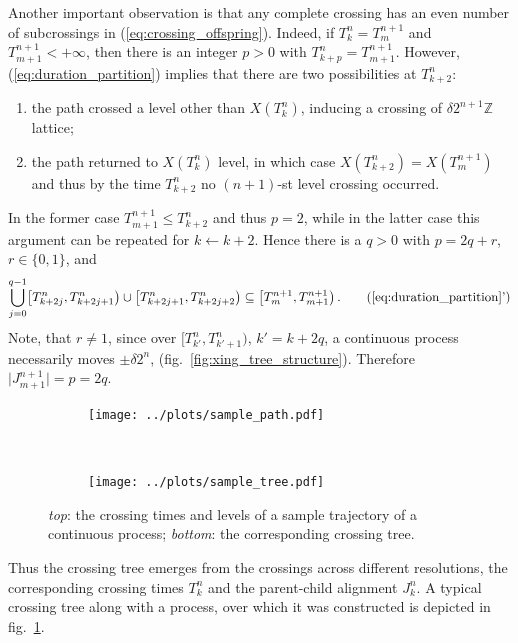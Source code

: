 \documentclass[a4paper]{article}
\begin{document}
Another important observation is that any complete crossing has an even number of
subcrossings in (\ref{eq:crossing_offspring}). Indeed, if $T_k^n = T_m^{n+1}$ and
$T_{m+1}^{n+1} < +\infty$, then there is an integer $p > 0$ with $T_{k+p}^n = T_{m+1}^{n+1}$.
However, (\ref{eq:duration_partition}) implies that there are two possibilities at
$T_{k+2}^n$:
\begin{enumerate}
    \item the path crossed a level other than $X(T_k^n)$, inducing a crossing of
    $\delta 2^{n+1}\mathbb{Z}$ lattice;
    \item the path returned to $X(T_k^n)$ level, in which case $X(T_{k+2}^n) = X(T_m^{n+1})$
    and thus by the time $T_{k+2}^n$ no $(n+1)$-st level crossing occurred.
\end{enumerate}
In the former case $T_{m+1}^{n+1} \leq T_{k+2}^n$ and thus $p=2$, while in the latter
case this argument can be repeated for $k \leftarrow k+2$. Hence there is a $q > 0$
with $p = 2q + r$, $r \in \{0, 1\}$, and
\begin{equation*} \label{eq:subcrossing_partition}
    \bigcup_{j=0}^{q-1} \bigl[T_{k+2j}^n, T_{k+2j+1}^n\bigr)
                   \cup \bigl[T_{k+2j+1}^n, T_{k+2j+2}^n\bigr)
        \subseteq \bigl[T_m^{n+1}, T_{m+1}^{n+1}\bigr) \,.
        \tag{\ref{eq:duration_partition}'}
\end{equation*}
Note, that $r\neq 1$, since over $\bigl[T_{k'}^n, T_{k'+1}^n\bigr)$, $k' = k + 2q$,
a continuous process necessarily moves $\pm \delta 2^n$, (fig.~\ref{fig:xing_tree_structure}).
Therefore $\bigl| J_{m+1}^{n+1} \bigr| = p = 2q$.

\begin{figure}[ht]
    \centering
    \begin{subfigure}{\linewidth}
        \texttt{[image: ../plots/sample\_path.pdf]}
    \end{subfigure}\\
    \vspace{-20pt}
    \begin{subfigure}{\linewidth}
        \texttt{[image: ../plots/sample\_tree.pdf]}
    \end{subfigure}
    \vspace{-10pt}
    \caption{\emph{top}: the crossing times and levels of a sample trajectory of
    a continuous process; \emph{bottom}: the corresponding crossing tree.}
    \label{fig:sample_tree}
\end{figure}

Thus the crossing tree emerges from the crossings across different resolutions, the
corresponding crossing times $T_k^n$ and the parent-child alignment $J_k^n$. A typical
crossing tree along with a process, over which it was constructed is depicted in
fig.~\ref{fig:sample_tree}.
\end{document}
